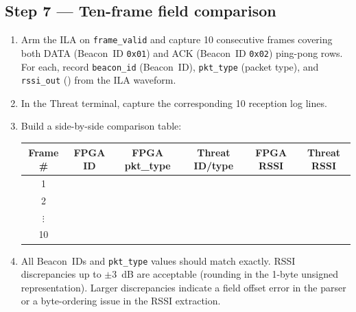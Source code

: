 \documentclass[11pt,letterpaper]{article}
\begin{document}

\subsection{Step 7 --- Ten-frame field comparison}
\begin{enumerate}[leftmargin=2em]
	\item Arm the \mbox{ILA} on \texttt{frame\_valid} and capture 10 consecutive frames covering both DATA (Beacon~ID \texttt{0x01}) and ACK (Beacon~ID \texttt{0x02}) ping-pong rows. For each, record \texttt{beacon\_id} (Beacon~ID), \texttt{pkt\_type} (packet type), and \texttt{rssi\_out} (\RSSI{}) from the \mbox{ILA} waveform.
	\item In the Threat terminal, capture the corresponding 10 reception log lines.
	\item Build a side-by-side comparison table:
	\begin{center}
		\begin{tabular}{c c c c c c}
			\toprule
			\textbf{Frame \#} & \textbf{FPGA ID} & \textbf{FPGA pkt\_type} & \textbf{Threat ID/type} & \textbf{FPGA RSSI} & \textbf{Threat RSSI} \\
			\midrule
			1 & & & & & \\
			2 & & & & & \\
			$\vdots$ & & & & & \\
			10 & & & & & \\
			\bottomrule
		\end{tabular}
	\end{center}
	\item All Beacon~\mbox{ID}s and \texttt{pkt\_type} values should match exactly. \mbox{RSSI} discrepancies up to $\pm$3~dB are acceptable (rounding in the 1-byte unsigned representation). Larger discrepancies indicate a field offset error in the parser or a byte-ordering issue in the \mbox{RSSI{}} extraction.
\end{enumerate}
\end{document}

